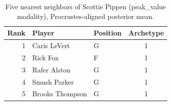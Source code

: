 \begin{table}[htbp]
  \centering\small
  \begin{tabular}{rllc}
    \toprule
    Rank & Player & Position & Archetype \\
    \midrule
    1 & Caris LeVert & G & 1 \\
    2 & Rick Fox & F & 1 \\
    3 & Rafer Alston & G & 1 \\
    4 & Smush Parker & G & 1 \\
    5 & Brooks Thompson & G & 1 \\
    \bottomrule
  \end{tabular}
  \caption{Five nearest neighbors of Scottie Pippen (peak_value modality), Procrustes-aligned posterior mean.}
  \label{tab:Scottie_Pippen_neighbors_peak_value}
\end{table}

